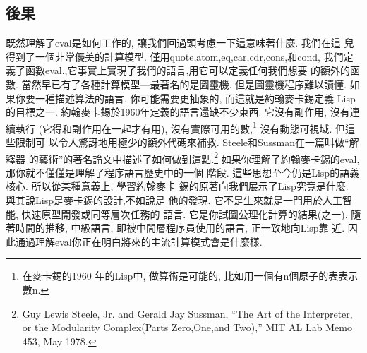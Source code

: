 \documentclass[12pt,a4]{article}
\begin{document}
\begin{CJK}{UTF8}{bsmi}
\section{後果} 
既然理解了eval是如何工作的, 
讓我們回過頭考慮一下這意味著什麼. 
我們在這 
兒得到了一個非常優美的計算模型. 
僅用quote,atom,eq,car,cdr,cons,和cond, 
我們定義了函數eval.,它事實上實現了我們的語言,用它可以定義任何我們想要 
的額外的函數. 
當然早已有了各種計算模型---最著名的是圖靈機. 
但是圖靈機程序難以讀懂. 
如果你要一種描述算法的語言, 
你可能需要更抽象的, 
而這就是約翰麥卡錫定義 
Lisp的目標之一. 
約翰麥卡錫於1960年定義的語言還缺不少東西. 
它沒有副作用, 
沒有連續執行 
(它得和副作用在一起才有用), 
沒有實際可用的數,\footnote{在麥卡錫的1960 
年的Lisp中, 
做算術是可能的, 
比如用一個有n個原子的表表示數n.} 
沒有動態可視域. 
但這些限制可 
以令人驚訝地用極少的額外代碼來補救. 
Steele和Sussman在一篇叫做``解釋器 
的藝術''的著名論文中描述了如何做到這點.\footnote{Guy 
Lewis 
Steele, 
Jr. 
and 
Gerald 
Jay 
Sussman, 
``The 
Art 
of 
the 
Interpreter, 
or 
the 
Modularity 
Complex(Parts 
Zero,One,and 
Two),'' 
MIT 
AL 
Lab 
Memo 
453, 
May 
1978.} 
如果你理解了約翰麥卡錫的eval, 
那你就不僅僅是理解了程序語言歷史中的一個 
階段. 
這些思想至今仍是Lisp的語義核心. 
所以從某種意義上, 
學習約翰麥卡 
錫的原著向我們展示了Lisp究竟是什麼. 
與其說Lisp是麥卡錫的設計,不如說是 
他的發現. 
它不是生來就是一門用於人工智能, 
快速原型開發或同等層次任務的 
語言. 
它是你試圖公理化計算的結果(之一). 
隨著時間的推移, 
中級語言, 
即被中間層程序員使用的語言, 
正一致地向Lisp靠 
近. 
因此通過理解eval你正在明白將來的主流計算模式會是什麼樣. 

\end{CJK}
\end{document}
